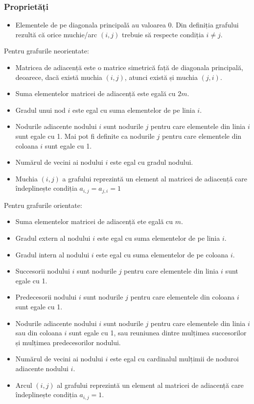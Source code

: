 \documentclass[9pt,a4paper]{report}
\begin{document}
\subsubsection*{Proprietăți}

\begin{itemize}
    \item Elementele de pe diagonala principală au valoarea 0. Din definiția grafului rezultă că orice muchie/arc $(i,j)$ trebuie să respecte condiția $i \neq j$.
\end{itemize}

Pentru grafurile neorientate:

\begin{itemize}
    \item Matricea de adiacență este o matrice simetrică față de diagonala principală, deoarece, dacă există muchia $(i, j)$, atunci există și muchia $(j, i)$.
    \item Suma elementelor matricei de adiacență este egală cu $2m$.
    \item Gradul unui nod $i$ este egal cu suma elementelor de pe linia $i$.
    \item Nodurile adiacente nodului $i$ sunt nodurile $j$ pentru care elementele din linia $i$ sunt egale cu 1. Mai pot fi definite ca nodurile $j$ pentru care elementele din coloana $i$ sunt egale cu 1.
    \item Numărul de vecini ai nodului $i$ este egal cu gradul nodului.
    \item Muchia $(i,j)$ a grafului reprezintă un element al matricei de adiacență care îndeplinește condiția $a_{i,j}=a_{j,i}=1$
\end{itemize}

Pentru grafurile orientate:

\begin{itemize}
    \item Suma elementelor matricei de adiacență ete egală cu $m$.
    \item Gradul extern al nodului $i$ este egal cu suma elementelor de pe linia $i$.
    \item Gradul intern al nodului $i$ este egal cu suma elementelor de pe coloana $i$.
    \item Succesorii nodului $i$ sunt nodurile $j$ pentru care elementele din linia $i$ sunt egale cu 1.
    \item Predecesorii nodului $i$ sunt nodurile $j$ pentru care elementele din coloana $i$ sunt egale cu 1.
    \item Nodurile adiacente nodului $i$ sunt nodurile $j$ pentru care elementele din linia $i$ sau din coloana $i$ sunt egale cu 1, sau reuniunea dintre mulțimea succesorilor și mulțimea predecesorilor nodului.
    \item Numărul de vecini ai nodului $i$ este egal cu cardinalul mulțimii de noduroi adiacente nodului $i$.
    \item Arcul $(i,j)$ al grafului reprezintă un element al matricei de adiacență care îndeplinește condiția $a_{i,j}=1$.
\end{itemize}
\end{document}
